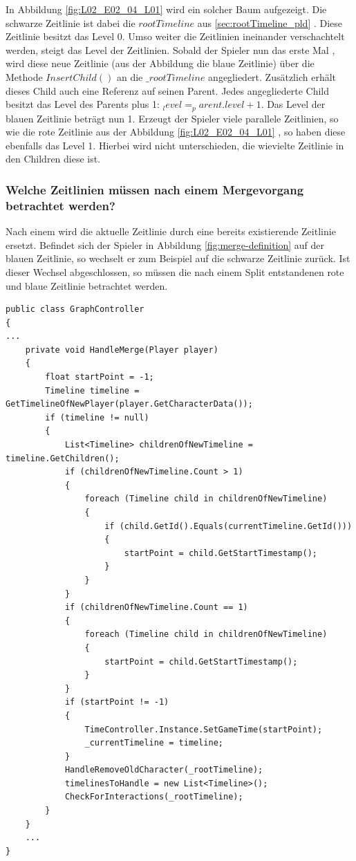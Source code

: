 In Abbildung \ref{fig:L02_E02_04_L01}  wird ein solcher Baum aufgezeigt. Die schwarze Zeitlinie ist dabei die $rootTimeline$ aus \ref{sec:rootTimeline_pld} . Diese Zeitlinie besitzt das Level 0. Umso weiter die Zeitlinien ineinander verschachtelt werden, steigt das Level der Zeitlinien. Sobald der Spieler nun das erste Mal , wird diese neue Zeitlinie (aus der Abbildung die blaue Zeitlinie) über die Methode $InsertChild()$ an die $\_rootTimeline$ angegliedert. Zusätzlich erhält dieses Child auch eine Referenz auf seinen Parent. Jedes angegliederte Child besitzt das Level des Parents plus 1: $_level = _parent.level +1$. Das Level der blauen Zeitlinie beträgt nun 1. Erzeugt der Spieler viele parallele  Zeitlinien, so wie die rote Zeitlinie aus der Abbildung \ref{fig:L02_E02_04_L01} , so haben diese ebenfalls das Level 1. Hierbei wird nicht unterschieden, die wievielte Zeitlinie in den Children diese ist. 

\subsubsection{Welche Zeitlinien müssen nach einem Mergevorgang betrachtet werden?}\label{sec:good_02}
Nach einem  wird die aktuelle Zeitlinie durch eine bereits existierende Zeitlinie ersetzt. Befindet sich der Spieler in Abbildung \ref{fig:merge-definition} auf der blauen Zeitlinie, so wechselt er zum Beispiel auf die schwarze Zeitlinie zurück. Ist dieser Wechsel abgeschlossen, so müssen die nach einem Split entstandenen rote und blaue Zeitlinie betrachtet werden.

\begin{lstlisting}[caption={HandleMerge Methode aus dem alten Prototyp}, label={sec:old_merge}]
public class GraphController
{
...
    private void HandleMerge(Player player)
    {
        float startPoint = -1;
        Timeline timeline = GetTimelineOfNewPlayer(player.GetCharacterData());
        if (timeline != null)
        {
            List<Timeline> childrenOfNewTimeline = timeline.GetChildren();
            if (childrenOfNewTimeline.Count > 1)
            {
                foreach (Timeline child in childrenOfNewTimeline)
                {
                    if (child.GetId().Equals(currentTimeline.GetId()))
                    {
                        startPoint = child.GetStartTimestamp();
                    }
                }
            }
            if (childrenOfNewTimeline.Count == 1)
            {
                foreach (Timeline child in childrenOfNewTimeline)
                {
                    startPoint = child.GetStartTimestamp();
                }
            }
            if (startPoint != -1)
            {
                TimeController.Instance.SetGameTime(startPoint);
                _currentTimeline = timeline;
            }
            HandleRemoveOldCharacter(_rootTimeline);
            timelinesToHandle = new List<Timeline>();
            CheckForInteractions(_rootTimeline);
        }
    }
    ...
}
\end{lstlisting}


